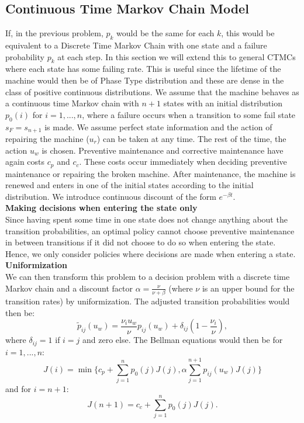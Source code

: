 \subsection{Continuous Time Markov Chain Model}
If, in the previous problem, $p_k$ would be the same for each $k$, this would be equivalent to a Discrete Time Markov Chain with one state and a failure probability $p_k$ at each step. In this section we will extend this to general CTMCs where each state has some failing rate. This is useful since the lifetime of the machine would then be of Phase Type distribution and these are dense in the class of positive continuous distributions\citep{Buchholz2014}. We assume that the machine behaves as a continuous time Markov chain with $n+1$ states with an initial distribution $p_0(i)$ for $i=1,...,n$, where a failure occurs when a transition to some fail state $s_F=s_{n+1}$ is made. We assume perfect state information and the action of repairing the machine ($u_r$) can be taken at any time. The rest of the time, the action $u_w$ is chosen. Preventive maintenance and corrective maintenance have again costs $c_p$ and $c_c$. These costs occur immediately when deciding preventive maintenance or repairing the broken machine. After maintenance, the machine is renewed and enters in one of the initial states according to the initial distribution. We introduce continuous discount of the form $e^{-\beta t}$.
\\
\textbf{Making decisions when entering the state only}\\
Since having spent some time in one state does not change anything about the transition probabilities, an optimal policy cannot choose preventive maintenance in between transitions if it did not choose to do so when entering the state. Hence, we only consider policies where decisions are made when entering a state.
\\
\textbf{Uniformization}\\
We can then transform this problem to a decision problem with a discrete time Markov chain and a discount factor $\alpha=\frac{\nu}{\nu+\beta}$ (where $\nu$ is an upper bound for the transition rates) by uniformization\citep{Ross2014}. The adjusted transition probabilities would then be\cite{Ross2014}:
$$
	\tilde{p}_{ij}(u_w)=\frac{\nu_i{u_w}}{\nu}p_{ij}(u_w)+\delta_{ij}(1-\frac{\nu_i}{\nu}),
$$
where $\delta_{ij}=1$ if $i=j$ and zero else. The Bellman equations would then be for $i=1,...,n$:
$$
	J(i)=\min\{c_p+\sum\limits_{j=1}^np_0(j)J(j), \alpha\sum\limits_{j=1}^{n+1}p_{ij}(u_w)J(j)\}
$$
and for $i=n+1$:
$$
	J(n+1)=c_c+\sum\limits_{j=1}^np_0(j)J(j).
$$
